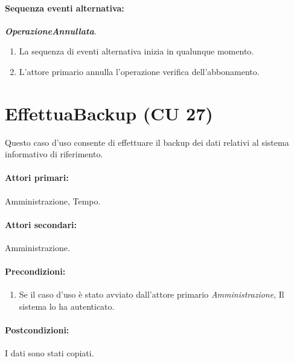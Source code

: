 \documentclass{article}
\begin{document}
    	\paragraph{Sequenza eventi alternativa:} \textbf{\textit{OperazioneAnnullata}}.
	\begin{enumerate}[itemsep=8pt,parsep=0pt]
	\item La sequenza di eventi alternativa inizia in qualunque momento.
	\item L'attore primario annulla l'operazione verifica dell'abbonamento.
	\end{enumerate}
    
    
    
    


\newpage

\section*{EffettuaBackup (CU 27)}
	
	\indent\indent Questo caso d’uso consente di effettuare il backup dei dati relativi al sistema informativo di riferimento.
	
	\paragraph{Attori primari:}Amministrazione, Tempo.
	
	\paragraph{Attori secondari:}Amministrazione.
	
	\paragraph{Precondizioni:}
		\begin{enumerate}	[itemsep=8pt,parsep=0pt]
			\item Se il caso d'uso è stato avviato dall'attore primario \emph{Amministrazione}, Il sistema lo ha autenticato.
		\end{enumerate}
	
	\paragraph{Postcondizioni:}I dati sono stati copiati.
	
\end{document}
